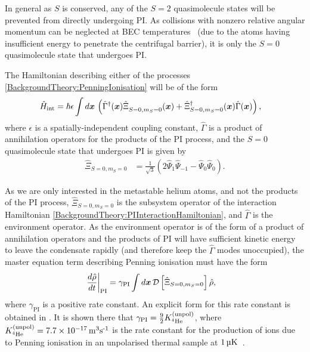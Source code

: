 In general as $S$ is conserved, any of the $S=2$ quasimolecule states will be prevented from directly undergoing PI. As collisions with nonzero relative angular momentum can be neglected at BEC temperatures~\citep{Venturi:2000,Stas:2006kx} (due to the atoms having insufficient energy to penetrate the centrifugal barrier), it is only the $S=0$ quasimolecule state that undergoes PI.

The Hamiltonian describing either of the processes \eqref{BackgroundTheory:PenningIonisation} will be of the form
\begin{align}
    \hat{H}_\text{int} &= \hbar \epsilon \int d \vect{x}\, \left(\hat{\Gamma}^\dagger(\vect{x})\hat{\Xi}_{S=0, m_S=0}^{\phantom{\dagger}}(\vect{x}) + \hat{\Xi}_{S=0, m_S=0}^\dagger (\vect{x}) \hat{\Gamma}(\vect{x}) \right), \label{BackgroundTheory:PIInteractionHamiltonian}
\end{align}
where $\epsilon$ is a spatially-independent coupling constant, $\hat{\Gamma}$ is a product of annihilation operators for the products of the PI process, and the $S=0$ quasimolecule state that undergoes PI is given by
\begin{align}
    \hat{\Xi}_{S=0, m_S=0} &= \frac{1}{\sqrt{3}} \left( 2 \hat{\Psi}_1 \hat{\Psi}_{-1} - \hat{\Psi}_0 \hat{\Psi}_0\right).
\end{align}

As we are only interested in the metastable helium atoms, and not the products of the PI process, $\hat{\Xi}_{S=0, m_S=0}$ is the subsystem operator of the interaction Hamiltonian \eqref{BackgroundTheory:PIInteractionHamiltonian}, and $\hat{\Gamma}$ is the environment operator.  As the environment operator is of the form of a product of annihilation operators and the products of PI will have sufficient kinetic energy to leave the condensate rapidly (and therefore keep the $\hat{\Gamma}$ modes unoccupied), the master equation term describing Penning ionisation must have the form
\begin{align}
    \left.\frac{d \hat{\rho}}{dt}\right|_\text{PI} &= \gamma_\text{PI} \int d \vect{x}\, \mathcal{D}\left[ \hat{\Xi}_{S=0, m_S=0}\right] \hat{\rho}, \label{BackgroundTheory:PenningIonisationMasterEquationTerm}
\end{align}
where $\gamma_\text{PI}$ is a positive rate constant.  An explicit form for this rate constant is obtained in .  It is shown there that $\gamma_\text{PI} = \frac{9}{2} K^\text{(unpol)}_{^4\text{He}}$, where $\Kunpol = \unit[7.7\times 10^{-17}]{m\textsuperscript{3}s\textsuperscript{-1}}$ is the rate constant for the production of ions due to Penning ionisation in an unpolarised thermal sample at $\unit[1]{\micro K}$~\citep{Stas:2006kx}.

